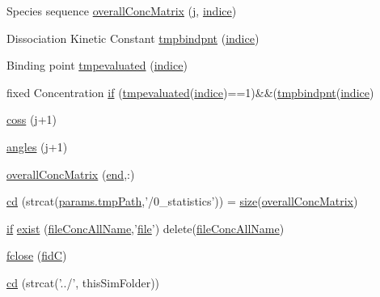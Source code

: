 \begin{DoxyCompactItemize}
\item 
Species sequence \hyperlink{a00025_aafaf668a3a1fbcc622062635e470ba72}{overall\-Conc\-Matrix} (\hyperlink{a00110_ac86694252f8dfdb19aaeadc4b7c342c6}{j}, \hyperlink{a00025_a776b2bbd08be028d44f6d4260f27633a}{indice})
\item 
Dissociation Kinetic Constant \hyperlink{a00025_a00f81a9dbc71b6c82583a1be559f70e2}{tmpbindpnt} (\hyperlink{a00025_a776b2bbd08be028d44f6d4260f27633a}{indice})
\item 
Binding point \hyperlink{a00025_a578805b808d01076403bf6fb9f7f0dab}{tmpevaluated} (\hyperlink{a00025_a776b2bbd08be028d44f6d4260f27633a}{indice})
\item 
fixed Concentration \hyperlink{a00025_ab824f8578204315feac8f0d0c6f25b2c}{if} (\hyperlink{a00025_a578805b808d01076403bf6fb9f7f0dab}{tmpevaluated}(\hyperlink{a00025_a776b2bbd08be028d44f6d4260f27633a}{indice})==1)\&\&(\hyperlink{a00025_a00f81a9dbc71b6c82583a1be559f70e2}{tmpbindpnt}(\hyperlink{a00025_a776b2bbd08be028d44f6d4260f27633a}{indice})
\item 
\hyperlink{a00025_aef980037b6271b6ab8be33ae415ef453}{coss} (\hyperlink{a00110_ac86694252f8dfdb19aaeadc4b7c342c6}{j}+1)
\item 
\hyperlink{a00025_ab0f774a1c2475b84dc2f125473693bc2}{angles} (\hyperlink{a00110_ac86694252f8dfdb19aaeadc4b7c342c6}{j}+1)
\item 
\hyperlink{a00025_a91ebfde92d1bf0522290062b808c9e9e}{overall\-Conc\-Matrix} (\hyperlink{a00025_afb358f48b1646c750fb9da6c6585be2b}{end},\-:)
\item 
\hyperlink{a00025_a4745c86f44382225b251e3640cb2fe63}{cd} (strcat(\hyperlink{a00032_a1e5a4863ab2b87f923e1d19e2da1f5ac}{params.\-tmp\-Path},'/0\-\_\-statistics')) = \hyperlink{a00104_ae113ea7f9e515a12ac4b5595c6faf61e}{size}(\hyperlink{a00025_a576dd8edd1b0fd4cc65709a59b308518}{overall\-Conc\-Matrix})
\item 
\hyperlink{a00030_a01d55766b8058903dd360b4bda71f9f5}{if} \hyperlink{a00025_ab05bb9470ea34cab3ab1c2c9e748840b}{exist} (\hyperlink{a00025_a45b397c4e1bd8e68da97ba6d26fbb41f}{file\-Conc\-All\-Name},'\hyperlink{a00110_a4e8353d6c62cf54bf4a1a8f63e56b8c3}{file}') delete(\hyperlink{a00025_a45b397c4e1bd8e68da97ba6d26fbb41f}{file\-Conc\-All\-Name})
\item 
\hyperlink{a00025_a210fb0ae3c985ed0d3c1d439a131b48c}{fclose} (\hyperlink{a00025_a5650dbe23ad9065391c1ea56f8acd34c}{fid\-C})
\item 
\hyperlink{a00025_a31bfd2803e4b18891d268c6a018db432}{cd} (strcat('../', this\-Sim\-Folder))

\end{DoxyCompactItemize}
